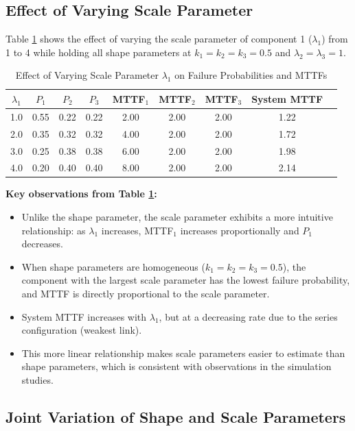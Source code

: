 \documentclass[11pt]{article}
\begin{document}
\subsection{Effect of Varying Scale Parameter}

Table \ref{tab:vary-scale} shows the effect of varying the scale parameter of component 1 ($\lambda_1$) from 1 to 4 while holding all shape parameters at $k_1 = k_2 = k_3 = 0.5$ and $\lambda_2 = \lambda_3 = 1$.

\begin{table}[htbp]
\centering
\caption{Effect of Varying Scale Parameter $\lambda_1$ on Failure Probabilities and MTTFs}
\label{tab:vary-scale}
\small
\begin{tabular}{ccccccccc}
\hline
$\lambda_1$ & $P_1$ & $P_2$ & $P_3$ & MTTF$_1$ & MTTF$_2$ & MTTF$_3$ & System MTTF \\
\hline
1.0 & 0.55 & 0.22 & 0.22 & 2.00 & 2.00 & 2.00 & 1.22 \\
2.0 & 0.35 & 0.32 & 0.32 & 4.00 & 2.00 & 2.00 & 1.72 \\
3.0 & 0.25 & 0.38 & 0.38 & 6.00 & 2.00 & 2.00 & 1.98 \\
4.0 & 0.20 & 0.40 & 0.40 & 8.00 & 2.00 & 2.00 & 2.14 \\
\hline
\end{tabular}
\end{table}

\textbf{Key observations from Table \ref{tab:vary-scale}:}

\begin{itemize}
\item Unlike the shape parameter, the scale parameter exhibits a more intuitive relationship: as $\lambda_1$ increases, MTTF$_1$ increases proportionally and $P_1$ decreases.
\item When shape parameters are homogeneous ($k_1 = k_2 = k_3 = 0.5$), the component with the largest scale parameter has the lowest failure probability, and MTTF is directly proportional to the scale parameter.
\item System MTTF increases with $\lambda_1$, but at a decreasing rate due to the series configuration (weakest link).
\item This more linear relationship makes scale parameters easier to estimate than shape parameters, which is consistent with observations in the simulation studies.
\end{itemize}

\subsection{Joint Variation of Shape and Scale Parameters}
\end{document}
